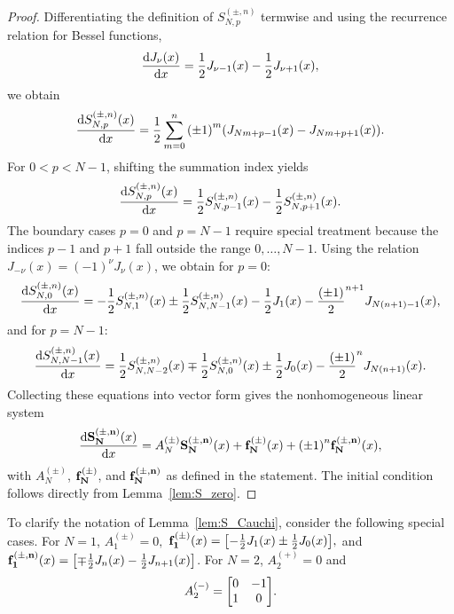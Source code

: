 \documentclass{article}
\begin{document}
\begin{proof}
Differentiating the definition of $S^{(\pm, n)}_{N,p}$ termwise and using the recurrence relation for Bessel functions,
\begin{equation}
\dv{J_\nu(x)}{x} = \frac{1}{2} J_{\nu-1}(x) - \frac{1}{2} J_{\nu+1}(x),
\end{equation}
we obtain
\begin{equation}
\dv{S^{(\pm, n)}_{N,p}(x)}{x} = \frac{1}{2} \sum_{m=0}^{n} \qty(\pm 1)^m \qty(J_{Nm+p-1}(x) - J_{Nm+p+1}(x)).
\end{equation}
For $0 < p < N-1$, shifting the summation index yields
\begin{equation}
\dv{S^{(\pm, n)}_{N,p}(x)}{x} = \frac{1}{2} S^{(\pm,n)}_{N,p-1}(x) - \frac{1}{2} S^{(\pm,n)}_{N,p+1}(x).
\end{equation}
The boundary cases $p=0$ and $p=N-1$ require special treatment because the indices $p-1$ and $p+1$ fall outside the range $0,\dots,N-1$. Using the relation $J_{-\nu}(x) = (-1)^\nu J_\nu(x)$, we obtain for $p=0$:
\begin{equation}
\dv{S^{(\pm,n)}_{N,0}(x)}{x} = -\frac{1}{2} S^{(\pm,n)}_{N,1}(x) \pm \frac{1}{2} S^{(\pm,n)}_{N,N-1}(x)
- \frac{1}{2} J_{1}(x) - \frac{\qty(\pm 1)}{2}^{n+1} J_{N(n+1)-1}(x),
\end{equation}
and for $p=N-1$:
\begin{equation}
\dv{S^{(\pm,n)}_{N,N-1}(x)}{x} = \frac{1}{2} S^{(\pm,n)}_{N,N-2}(x) \mp \frac{1}{2} S^{(\pm,n)}_{N,0}(x)
\pm \frac{1}{2} J_{0}(x) - \frac{\qty(\pm 1)}{2}^{n} J_{N(n+1)}(x).
\end{equation}
Collecting these equations into vector form gives the nonhomogeneous linear system
\begin{equation}
\dv{\vb{S^{(\pm,n)}_N}(x)}{x} = A^{(\pm)}_N \vb{S^{(\pm,n)}_N}(x) + \vb{f^{(\pm)}_N}(x) + \qty(\pm 1)^n \vb{f^{(\pm,n)}_N}(x),
\end{equation}
with $A^{(\pm)}_N$, $\vb{f^{(\pm)}_N}$, and $\vb{f^{(\pm,n)}_N}$ as defined in the statement. The initial condition follows directly from Lemma~\ref{lem:S_zero}.
\end{proof}

To clarify the notation of Lemma~\ref{lem:S_Cauchi}, consider the following special cases.
For $N=1$, $A^{(\pm)}_1=0,$
$\vb{f^{(\pm)}_1}(x) = \mqty[-\frac{1}{2} J_1(x) \pm \frac{1}{2} J_0(x)],$
and
$\vb{f^{(\pm,n)}_1}(x) = \mqty[\mp \frac{1}{2} J_{n}(x) -\frac{1}{2} J_{n+1}(x)]$.
For $N=2$, $A^{(+)}_2=0$ and
$$
A^{(-)}_2 = \mqty[0 & -1\\1 & 0].
$$
\end{document}
